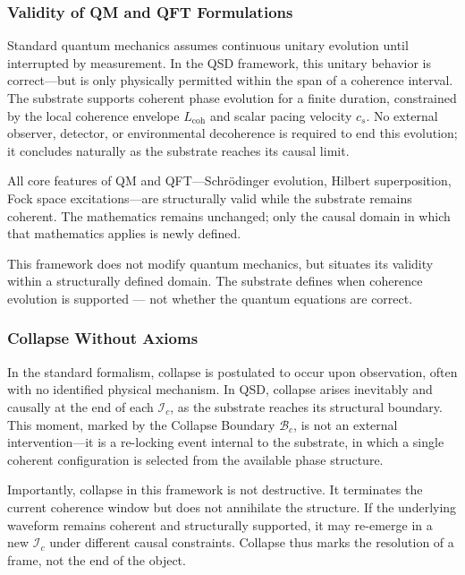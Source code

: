 \documentclass[preprints,article,submit,pdftex,moreauthors]{Definitions/mdpi}
\begin{document}
\subsubsection{Validity of QM and QFT Formulations}

Standard quantum mechanics assumes continuous unitary evolution until interrupted by measurement. In the QSD framework, this unitary behavior is correct—but is only physically permitted within the span of a coherence interval. The substrate supports coherent phase evolution for a finite duration, constrained by the local coherence envelope \( L_{\text{coh}} \) and scalar pacing velocity \( c_s \). No external observer, detector, or environmental decoherence is required to end this evolution; it concludes naturally as the substrate reaches its causal limit.

All core features of QM and QFT—Schrödinger evolution, Hilbert superposition, Fock space excitations—are structurally valid while the substrate remains coherent. The mathematics remains unchanged; only the causal domain in which that mathematics applies is newly defined.

This framework does not modify quantum mechanics, but situates its validity within a structurally defined domain. The substrate defines when coherence evolution is supported — not whether the quantum equations are correct.

\subsubsection{Collapse Without Axioms}

In the standard formalism, collapse is postulated to occur upon observation, often with no identified physical mechanism. In QSD, collapse arises inevitably and causally at the end of each \( \mathcal{I}_c \), as the substrate reaches its structural boundary. This moment, marked by the Collapse Boundary \( \mathcal{B}_c \), is not an external intervention—it is a re-locking event internal to the substrate, in which a single coherent configuration is selected from the available phase structure.

Importantly, collapse in this framework is not destructive. It terminates the current coherence window but does not annihilate the structure. If the underlying waveform remains coherent and structurally supported, it may re-emerge in a new \( \mathcal{I}_c \) under different causal constraints. Collapse thus marks the resolution of a frame, not the end of the object.
\end{document}
